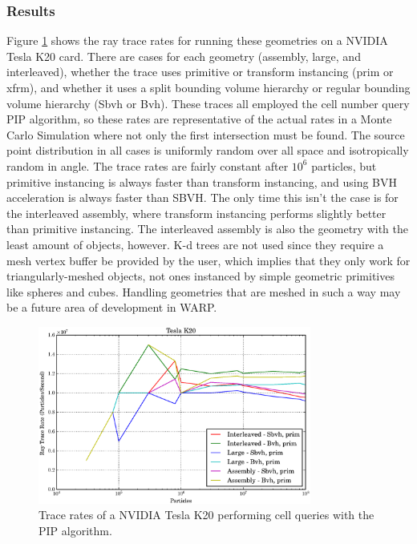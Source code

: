 \subsubsection{Results}

Figure \ref{prelim_optix_k20} shows the ray trace rates for running these geometries on a NVIDIA Tesla K20 card.  There are cases for each geometry (assembly, large, and interleaved), whether the trace uses primitive or transform instancing (prim or xfrm), and whether it uses a split bounding volume hierarchy or regular bounding volume hierarchy (Sbvh or Bvh).  These traces all employed the cell number query PIP algorithm, so these rates are representative of the actual rates in a Monte Carlo Simulation where not only the first intersection must be found.  The source point distribution in all cases is uniformly random over all space and isotropically random in angle.  The trace rates are fairly constant after $10^6$ particles, but primitive instancing is always faster than transform instancing, and using BVH acceleration is always faster than SBVH.   The only time this isn't the case is for the interleaved assembly, where transform instancing performs slightly better than primitive instancing.  The interleaved assembly is also the geometry with the least amount of objects, however.  K-d trees are not used since they require a mesh vertex buffer be provided by the user, which implies that they only work for triangularly-meshed objects, not ones instanced by simple geometric primitives like spheres and cubes.  Handling geometries that are meshed in such a way may be a future area of development in WARP.

\begin{figure}[h!] 
  \centering
    \includegraphics[width=0.8\textwidth]{graphics/prelim_optix_k20.eps}
     \caption{Trace rates of a NVIDIA Tesla K20 performing cell queries with the PIP algorithm. \label{prelim_optix_k20} }
\end{figure}

